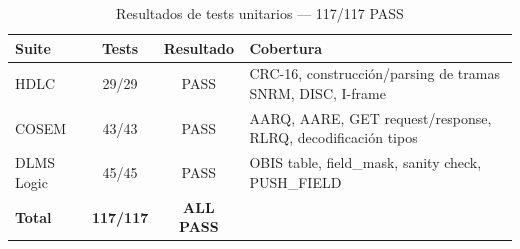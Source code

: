 \begin{table}[htbp]
\centering
\caption{Resultados de tests unitarios --- 117/117 PASS}
\label{tab:unit-tests}
\begin{tabular}{@{}lccl@{}}
\toprule
\textbf{Suite} & \textbf{Tests} & \textbf{Resultado} & \textbf{Cobertura} \\
\midrule
HDLC        & 29/29 & PASS & CRC-16, construcción/parsing de tramas SNRM, DISC, I-frame \\
COSEM       & 43/43 & PASS & AARQ, AARE, GET request/response, RLRQ, decodificación tipos \\
DLMS Logic  & 45/45 & PASS & OBIS table, field\_mask, sanity check, PUSH\_FIELD \\
\midrule
\textbf{Total} & \textbf{117/117} & \textbf{ALL PASS} & \\
\bottomrule
\end{tabular}
\end{table}
